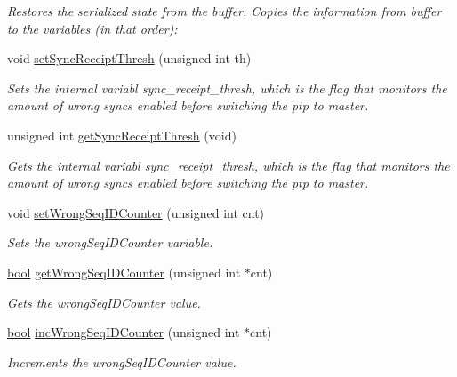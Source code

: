 \begin{DoxyCompactItemize}
\begin{DoxyCompactList}\small\item\em Restores the serialized state from the buffer. Copies the information from buffer to the variables (in that order)\+: \end{DoxyCompactList}\item 
void \hyperlink{class_common_port_a31540371431c3d5aae1a79e7e0a6d9da}{set\+Sync\+Receipt\+Thresh} (unsigned int th)
\begin{DoxyCompactList}\small\item\em Sets the internal variabl sync\+\_\+receipt\+\_\+thresh, which is the flag that monitors the amount of wrong syncs enabled before switching the ptp to master. \end{DoxyCompactList}\item 
unsigned int \hyperlink{class_common_port_a1d21b1d5b5ee2cd801e1a14a0b311ce4}{get\+Sync\+Receipt\+Thresh} (void)
\begin{DoxyCompactList}\small\item\em Gets the internal variabl sync\+\_\+receipt\+\_\+thresh, which is the flag that monitors the amount of wrong syncs enabled before switching the ptp to master. \end{DoxyCompactList}\item 
void \hyperlink{class_common_port_aac7cd9d30fe06fec928c5c895ec65b53}{set\+Wrong\+Seq\+I\+D\+Counter} (unsigned int cnt)
\begin{DoxyCompactList}\small\item\em Sets the wrong\+Seq\+I\+D\+Counter variable. \end{DoxyCompactList}\item 
\hyperlink{avb__gptp_8h_af6a258d8f3ee5206d682d799316314b1}{bool} \hyperlink{class_common_port_a78d1e5daea050c83aeef01a7b9a640ea}{get\+Wrong\+Seq\+I\+D\+Counter} (unsigned int $\ast$cnt)
\begin{DoxyCompactList}\small\item\em Gets the wrong\+Seq\+I\+D\+Counter value. \end{DoxyCompactList}\item 
\hyperlink{avb__gptp_8h_af6a258d8f3ee5206d682d799316314b1}{bool} \hyperlink{class_common_port_a1f75bd2d9889160f75d54aae507312be}{inc\+Wrong\+Seq\+I\+D\+Counter} (unsigned int $\ast$cnt)
\begin{DoxyCompactList}\small\item\em Increments the wrong\+Seq\+I\+D\+Counter value. \end{DoxyCompactList}\item 

\end{DoxyCompactItemize}
